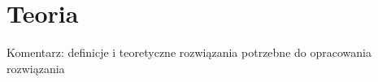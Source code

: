 \chapter{Teoria}

Komentarz: definicje i teoretyczne rozwiązania potrzebne do opracowania rozwiązania